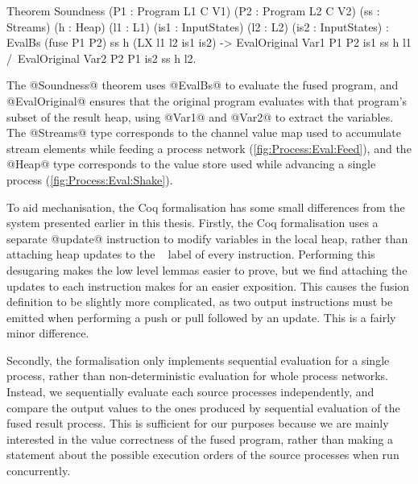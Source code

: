 
\begin{coq}
Theorem Soundness (P1 : Program L1 C V1) (P2  : Program L2 C V2)
                  (ss : Streams)         (h   : Heap)
                  (l1 : L1)              (is1 : InputStates)
                  (l2 : L2)              (is2 : InputStates)
  :  EvalBs (fuse P1 P2) ss h (LX l1 l2 is1 is2)
  -> EvalOriginal Var1 P1 P2 is1 ss h l1
  /\ EvalOriginal Var2 P2 P1 is2 ss h l2.
\end{coq}

The @Soundness@ theorem uses @EvalBs@ to evaluate the fused program, and @EvalOriginal@ ensures that the original program evaluates with that program's subset of the result heap, using @Var1@ and @Var2@ to extract the variables.
The @Streams@ type corresponds to the channel value map used to accumulate stream elements while feeding a process network (\cref{fig:Process:Eval:Feed}), and the @Heap@ type corresponds to the value store used while advancing a single process (\cref{fig:Process:Eval:Shake}).


To aid mechanisation, the Coq formalisation has some small differences from the system presented earlier in this thesis.
Firstly, the Coq formalisation uses a separate @update@ instruction to modify variables in the local heap, rather than attaching heap updates to the \Next~ label of every instruction.
Performing this desugaring makes the low level lemmas easier to prove, but we find attaching the updates to each instruction makes for an easier exposition.
This causes the fusion definition to be slightly more complicated, as two output instructions must be emitted when performing a push or pull followed by an update.
This is a fairly minor difference.

Secondly, the formalisation only implements sequential evaluation for a single process, rather than non-deterministic evaluation for whole process networks.
Instead, we sequentially evaluate each source processes independently, and compare the output values to the ones produced by sequential evaluation of the fused result process.
This is sufficient for our purposes because we are mainly interested in the value correctness of the fused program, rather than making a statement about the possible execution orders of the source processes when run concurrently.

